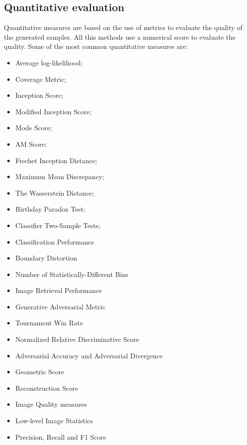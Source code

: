 \subsection{Quantitative evaluation}
\label{subsec:quantitative-evaluation}
Quantitative measures are based on the use of metrics to evaluate the quality of the generated samples.
All this methods use a numerical score to evaluate the quality.
Some of the most common quantitative measures are:
\begin{itemize}
    \item Average log-likelihood;
    \item Coverage Metric;
    \item Inception Score;
    \item Modified Inception Score;
    \item Mode Score;
    \item AM Score;
    \item Frechet Inception Distance;
    \item Maximum Mean Discrepancy;
    \item The Wasserstein Distance;
    \item Birthday Paradox Test;
    \item Classifier Two-Sample Tests;
    \item Classification Performance
    \item Boundary Distortion 
    \item Number of Statistically-Different Bins
    \item Image Retrieval Performance
    \item Generative Adversarial Metric
    \item Tournament Win Rate
    \item Normalized Relative Discriminative Score
    \item Adversarial Accuracy and Adversarial Divergence
    \item Geometric Score
    \item Reconstruction Score
    \item Image Quality measures
    \item Low-level Image Statistics
    \item Precision, Recall and F1 Score
\end{itemize}